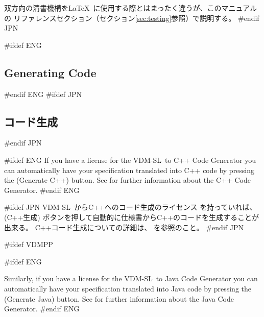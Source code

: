 \documentclass[\pformat,12pt]{article}
\newcommand{\vdmslpp}{VDM-SL}
\newcommand{\vdmslpp}{VDM++}
\newcommand{\guicmd}[1]{{\sf #1}}
\newcommand{\guicmd}[1]{{\gt #1}}
\begin{document}
双方向の清書機構を\LaTeX\ に使用する際とはまったく違うが、このマニュアルの
リファレンスセクション（セクション\ref{sec:testing}参照）で説明する。
#endif JPN

#ifdef ENG
\subsection{Generating Code}
#endif ENG
#ifdef JPN
\subsection{コード生成}
#endif JPN

#ifdef ENG
If you have a license  for the \vdmslpp\ to C++
Code Generator you can automatically have your specification
translated into C++ code by pressing the 
(\guicmd{Generate C++}) button. See
 for further
information about the C++ Code Generator.
#endif ENG

#ifdef JPN
\vdmslpp\ からC++へのコード生成のライセンス を持っていれば、 
(\guicmd{C++生成}) ボタンを押して自動的に仕様書からC++のコードを生成することが出来る。
C++コード生成についての詳細は、
を参照のこと。
#endif JPN

#ifdef VDMPP

#ifdef ENG

Similarly, if you have a license  for the \vdmslpp\ to Java
Code Generator you can automatically have your specification
translated into Java code by pressing the 
(\guicmd{Generate Java}) button. See
\cite{CGJavaManPP-CSK} for further information about the Java Code
Generator.
#endif ENG
\end{document}
